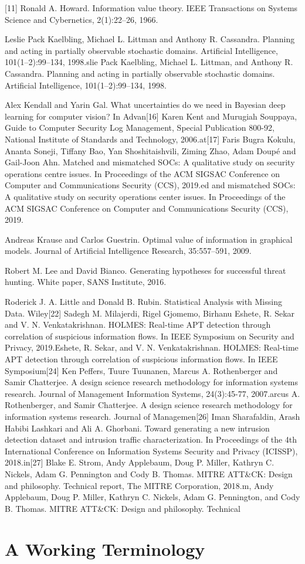 \documentclass[a4paper,11pt]{article}
\begin{document}
[11] Ronald A. Howard. Information value theory. IEEE Transactions on Systems Science and Cybernetics, 2(1):22–26, 1966.\par
[12][13] Leslie Pack Kaelbling, Michael L. Littman and Anthony R. Cassandra. Planning and acting in partially observable stochastic domains. Artificial Intelligence, 101(1–2):99–134, 1998.slie Pack Kaelbling, Michael L. Littman, and Anthony R. Cassandra. Planning and acting in partially observable stochastic domains. Artificial Intelligence, 101(1–2):99–134, 1998.\par
[14] Alex Kendall and Yarin Gal. What uncertainties do we need in Bayesian deep learning for computer vision? In Advan[16] Karen Kent and Murugiah Souppaya, Guide to Computer Security Log Management, Special Publication 800-92, National Institute of Standards and Technology, 2006.at[17] Faris Bugra Kokulu, Ananta Soneji, Tiffany Bao, Yan Shoshitaishvili, Ziming Zhao, Adam Doupé and Gail-Joon Ahn. Matched and mismatched SOCs: A qualitative study on security operations centre issues. In Proceedings of the ACM SIGSAC Conference on Computer and Communications Security (CCS), 2019.ed and mismatched SOCs: A qualitative study on security operations center issues. In Proceedings of the ACM SIGSAC Conference on Computer and Communications Security (CCS), 2019.\par
[18] Andreas Krause and Carlos Guestrin. Optimal value of information in graphical models. Journal of Artificial Intelligence Research, 35:557–591, 2009.\par
[19] Robert M. Lee and David Bianco. Generating hypotheses for successful threat hunting. White paper, SANS Institute, 2016.\par
[20] Roderick J. A. Little and Donald B. Rubin. Statistical Analysis with Missing Data. Wiley[22] Sadegh M. Milajerdi, Rigel Gjomemo, Birhanu Eshete, R. Sekar and V. N. Venkatakrishnan. HOLMES: Real-time APT detection through correlation of suspicious information flows. In IEEE Symposium on Security and Privacy, 2019.Eshete, R. Sekar, and V. N. Venkatakrishnan. HOLMES: Real-time APT detection through correlation of suspicious information flows. In IEEE Symposium[24] Ken Peffers, Tuure Tuunanen, Marcus A. Rothenberger and Samir Chatterjee. A design science research methodology for information systems research. Journal of Management Information Systems, 24(3):45-77, 2007.arcus A. Rothenberger, and Samir Chatterjee. A design science research methodology for information systems research. Journal of Managemen[26] Iman Sharafaldin, Arash Habibi Lashkari and Ali A. Ghorbani. Toward generating a new intrusion detection dataset and intrusion traffic characterization. In Proceedings of the 4th International Conference on Information Systems Security and Privacy (ICISSP), 2018.in[27] Blake E. Strom, Andy Applebaum, Doug P. Miller, Kathryn C. Nickels, Adam G. Pennington and Cody B. Thomas. MITRE ATT\&CK: Design and philosophy. Technical report, The MITRE Corporation, 2018.m, Andy Applebaum, Doug P. Miller, Kathryn C. Nickels, Adam G. Pennington, and Cody B. Thomas. MITRE ATT\&CK: Design and philosophy. Technical\section*{A Working Terminology}
\end{document}
